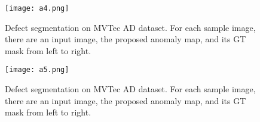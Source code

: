 \documentclass{article} \usepackage{iclr2022_conference,times}
\begin{document}
\begin{figure}[t]
\begin{center}
\texttt{[image: a4.png]} 
\end{center}
  \caption{Defect segmentation on MVTec AD dataset. For each sample image, there are an input image, the proposed anomaly map, and its GT mask from left to right.}
\label{fig15}
\end{figure}

\begin{figure}[t]
\begin{center}
\texttt{[image: a5.png]} 
\end{center}

  \caption{Defect segmentation on MVTec AD dataset. For each sample image, there are an input image, the proposed anomaly map, and its GT mask from left to right.}
\label{fig16}
\end{figure}
\end{document}
